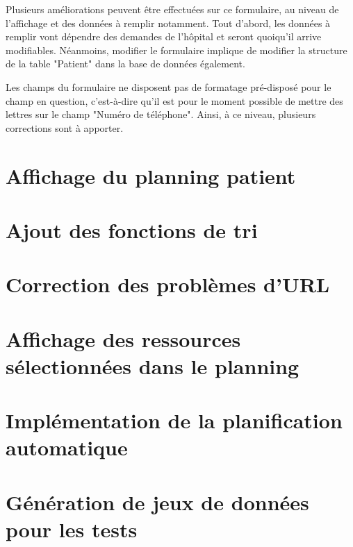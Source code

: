 \documentclass{polytech/polytech}
\begin{document}
Plusieurs améliorations peuvent être effectuées sur ce formulaire, au niveau de l'affichage et des données à remplir notamment. Tout d'abord, les données à remplir vont dépendre des demandes de l'hôpital et seront quoiqu'il arrive modifiables. Néanmoins, modifier le formulaire implique de modifier la structure de la table "Patient" dans la base de données également. 

Les champs du formulaire ne disposent pas de formatage pré-disposé pour le champ en question, c'est-à-dire qu'il est pour le moment possible de mettre des lettres sur le champ "Numéro de téléphone". Ainsi, à ce niveau, plusieurs corrections sont à apporter.


\section{Affichage du planning patient}


\section{Ajout des fonctions de tri}


\section{Correction des problèmes d'URL}


\section{Affichage des ressources sélectionnées dans le planning}


\section{Implémentation de la planification automatique}


\section{Génération de jeux de données pour les tests}



\end{document}
